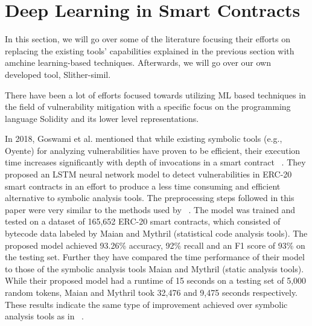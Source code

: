 \section{Deep Learning in Smart Contracts} \label{sec:dl-models}

In this section, we will go over some of the literature focusing their efforts on replacing the existing tools' capabilities explained in the previous section with amchine learning-based techniques. Afterwards, we will go over our own developed tool, Slither-simil.

There have been a lot of efforts focused towards utilizing ML based techniques in the field of vulnerability mitigation with a specific focus on the programming language Solidity and its lower level representations.

In 2018, Goswami et al. mentioned that while existing symbolic tools (e.g., Oyente) for analyzing vulnerabilities have proven to be efficient, their execution time increases significantly with depth of invocations in a smart contract ~\cite{grech2019gigahorse}.
They proposed an LSTM neural network model to detect vulnerabilities in ERC-20 smart contracts in an effort to produce a less time consuming and efficient alternative to symbolic analysis tools.
The preprocessing steps followed in this paper were very similar to the methods used by ~\cite{madmax}.
The model was trained and tested on a dataset of 165,652 ERC-20 smart contracts, which consisted of bytecode data labeled by Maian and Mythril (statistical code analysis tools).
The proposed model achieved 93.26\% accuracy, 92\% recall and an F1 score of 93\% on the testing set.
Further they have compared the time performance of their model to those of the symbolic analysis tools Maian and Mythril (static analysis tools).
While their proposed model had a runtime of 15 seconds on a testing set of 5,000 random tokens, Maian and Mythril took 32,476 and 9,475 seconds respectively.
These results indicate the same type of improvement achieved over symbolic analysis tools as in ~\cite{grech2019gigahorse}.

